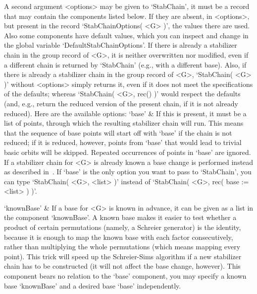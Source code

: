 A second argument <options>  may be given to `StabChain',   it must be  a
record that may contain the components listed  below. If they are absent,
in  <options>, but present in the   record `StabChainOptions( <G> )', the
values  there are used.  Also some components  have default values, which
you   can  inspect    and       change   in   the    global      variable
`DefaultStabChainOptions'. If there is already a  stabilizer chain in the
group record  of <G>, it is neither  overwritten nor modified, even  if a
different chain is returned by `StabChain' (e.g., with a different base).
Also, if there is already a stabilizer chain  in the group record of <G>,
`StabChain( <G> )'  without <options> simply  returns it, even if it does
not meet the specifications   of the defaults; whereas `StabChain(   <G>,
rec() )'  would respect  the  defaults  (and, e.g.,  return the   reduced
version of the present chain, if it is not already reduced). Here are the
available options:
\beginitems
`base' &
        If  this is present, it  must be a  list of points, through which
        the resulting  stabilizer  chain will run.   This means that  the
        sequence of base points  will start off  with `base' if the chain
        is not reduced;  if it  is  reduced, however,  points from `base'
        that would lead to trivial basic orbits will be skipped. Repeated
        occurrences of  points  in `base' are  ignored.  If  a stabilizer
        chain for <G> is already known a base change is performed instead
        as described in~\cite{Butler82b}. If  `base' is the only option
        you want  to pass to `StabChain',  you  can type `StabChain( <G>,
        <list> )' instead of `StabChain( <G>, rec( base := <list> ) )'.

`knownBase' &
        If a base for <G> is known in advance, it can be  given as a list
        in the component  `knownBase'. A  known  base makes it easier  to
        test whether a   product   of certain permutations  (namely,    a
        Schreier generator) is the identity, because  it is enough to map
        the known base  with   each  factor consecutively, rather    than
        multiplying the   whole permutations (which means   mapping every
        point). This trick will speed up the Schreier-Sims algorithm if a
        new  stabilizer chain has to  be constructed (it  will not affect
        the  base change, however). This   component bears no relation to
        the  `base' component, you  may specify a  known base `knownBase'
        and a desired base `base' independently.

